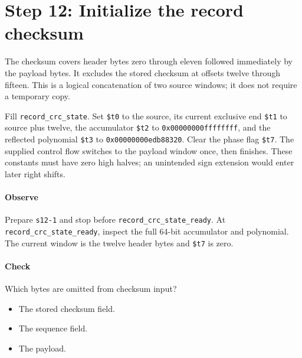 \section{Step 12: Initialize the record checksum}
The checksum covers header bytes zero through eleven followed immediately by
the payload bytes. It excludes the stored checksum at offsets twelve through
fifteen. This is a logical concatenation of two source windows; it does not
require a temporary copy.

Fill \texttt{record\_crc\_state}. Set \texttt{\$t0} to the source, its current
exclusive end \texttt{\$t1} to source plus twelve, the accumulator
\texttt{\$t2} to \texttt{0x00000000ffffffff}, and the reflected polynomial
\texttt{\$t3} to \texttt{0x00000000edb88320}. Clear the phase flag
\texttt{\$t7}. The supplied control flow switches to the payload window once,
then finishes. These constants must have zero high halves; an unintended
sign extension would enter later right shifts.

\paragraph{Observe} Prepare \texttt{s12-1} and stop before
\texttt{record\_crc\_state\_ready}. At \texttt{record\_crc\_state\_ready}, inspect the full 64-bit
accumulator and polynomial. The current window is the twelve header bytes and
\texttt{\$t7} is zero.

\paragraph{Check} Which bytes are omitted from checksum input?
\begin{itemize}
\item[A.] The stored checksum field.
\item[B.] The sequence field.
\item[C.] The payload.
\end{itemize}
